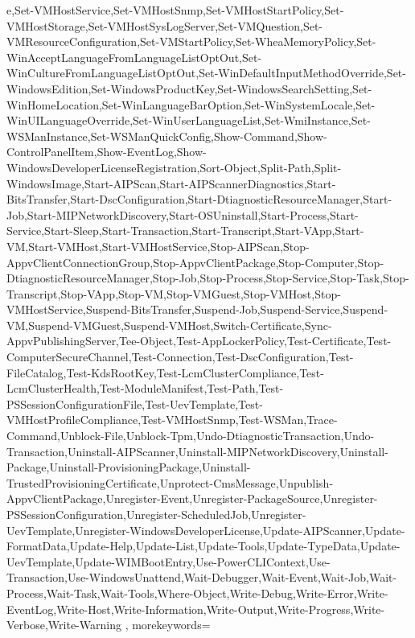 {{e,Set-VMHostService,Set-VMHostSnmp,Set-VMHostStartPolicy,Set-VMHostStorage,Set-VMHostSysLogServer,Set-VMQuestion,Set-VMResourceConfiguration,Set-VMStartPolicy,Set-WheaMemoryPolicy,Set-WinAcceptLanguageFromLanguageListOptOut,Set-WinCultureFromLanguageListOptOut,Set-WinDefaultInputMethodOverride,Set-WindowsEdition,Set-WindowsProductKey,Set-WindowsSearchSetting,Set-WinHomeLocation,Set-WinLanguageBarOption,Set-WinSystemLocale,Set-WinUILanguageOverride,Set-WinUserLanguageList,Set-WmiInstance,Set-WSManInstance,Set-WSManQuickConfig,Show-Command,Show-ControlPanelItem,Show-EventLog,Show-WindowsDeveloperLicenseRegistration,Sort-Object,Split-Path,Split-WindowsImage,Start-AIPScan,Start-AIPScannerDiagnostics,Start-BitsTransfer,Start-DscConfiguration,Start-DtiagnosticResourceManager,Start-Job,Start-MIPNetworkDiscovery,Start-OSUninstall,Start-Process,Start-Service,Start-Sleep,Start-Transaction,Start-Transcript,Start-VApp,Start-VM,Start-VMHost,Start-VMHostService,Stop-AIPScan,Stop-AppvClientConnectionGroup,Stop-AppvClientPackage,Stop-Computer,Stop-DtiagnosticResourceManager,Stop-Job,Stop-Process,Stop-Service,Stop-Task,Stop-Transcript,Stop-VApp,Stop-VM,Stop-VMGuest,Stop-VMHost,Stop-VMHostService,Suspend-BitsTransfer,Suspend-Job,Suspend-Service,Suspend-VM,Suspend-VMGuest,Suspend-VMHost,Switch-Certificate,Sync-AppvPublishingServer,Tee-Object,Test-AppLockerPolicy,Test-Certificate,Test-ComputerSecureChannel,Test-Connection,Test-DscConfiguration,Test-FileCatalog,Test-KdsRootKey,Test-LcmClusterCompliance,Test-LcmClusterHealth,Test-ModuleManifest,Test-Path,Test-PSSessionConfigurationFile,Test-UevTemplate,Test-VMHostProfileCompliance,Test-VMHostSnmp,Test-WSMan,Trace-Command,Unblock-File,Unblock-Tpm,Undo-DtiagnosticTransaction,Undo-Transaction,Uninstall-AIPScanner,Uninstall-MIPNetworkDiscovery,Uninstall-Package,Uninstall-ProvisioningPackage,Uninstall-TrustedProvisioningCertificate,Unprotect-CmsMessage,Unpublish-AppvClientPackage,Unregister-Event,Unregister-PackageSource,Unregister-PSSessionConfiguration,Unregister-ScheduledJob,Unregister-UevTemplate,Unregister-WindowsDeveloperLicense,Update-AIPScanner,Update-FormatData,Update-Help,Update-List,Update-Tools,Update-TypeData,Update-UevTemplate,Update-WIMBootEntry,Use-PowerCLIContext,Use-Transaction,Use-WindowsUnattend,Wait-Debugger,Wait-Event,Wait-Job,Wait-Process,Wait-Task,Wait-Tools,Where-Object,Write-Debug,Write-Error,Write-EventLog,Write-Host,Write-Information,Write-Output,Write-Progress,Write-Verbose,Write-Warning
	},
	morekeywords={
}}
